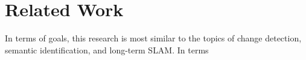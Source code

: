 \section{Related Work}
\label{sec:related_work}

In terms of goals, this research is most similar to the topics of change detection, semantic identification, and long-term SLAM. In terms

% 